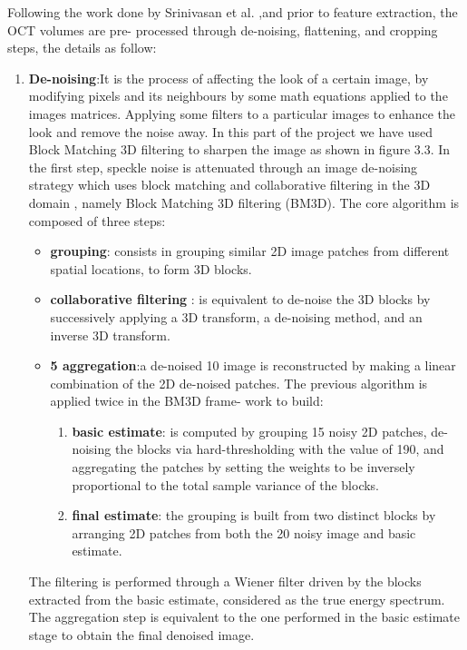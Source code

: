 Following the work done by Srinivasan et al. \cite{srinivasan2014fully},and prior to feature extraction, the OCT volumes are pre- processed through de-noising, flattening, and cropping steps, the details as follow:
\begin{enumerate}
\item \textbf{De-noising}:It is the process of affecting the look of a certain image, by modifying pixels and its neighbours by some math equations applied to the images matrices.
Applying some filters to a particular images to enhance the look and remove the noise away.
In this part of the project we have used Block Matching 3D filtering to sharpen the image as shown in figure 3.3.
In the first step, speckle noise is attenuated through an image de-noising strategy which uses block matching and collaborative filtering in the 3D domain \cite{dabov2007image}, namely Block Matching 3D filtering (BM3D).
The core algorithm is composed of three steps: 
\begin{itemize}
\item \textbf{grouping}: consists in grouping similar 2D image patches from different spatial locations, to form 3D blocks.
\item \textbf{collaborative filtering} : is equivalent to de-noise the 3D blocks by successively applying a 3D transform, a de-noising method, and an inverse 3D transform.
\item \textbf{5 aggregation}:a de-noised 10 image is reconstructed by making a linear combination of the 2D de-noised patches. The previous algorithm is applied twice in the BM3D frame- work to build:
\begin{enumerate}
\item \textbf{basic estimate}: is computed by grouping 15 noisy 2D patches, de-noising the blocks via hard-thresholding with the value of 190, and aggregating the patches by setting the weights to be inversely proportional to the total sample variance of the blocks.
\item \textbf{final estimate}: the grouping is built from two distinct blocks by arranging 2D patches from both the
20 noisy image and basic estimate.
\end{enumerate}  
\end{itemize} 
The filtering is performed through a Wiener filter driven by the blocks extracted from the basic estimate, considered as the true energy spectrum.
The aggregation step is equivalent to the one performed in the basic estimate stage to obtain the final denoised image.


\end{enumerate}
